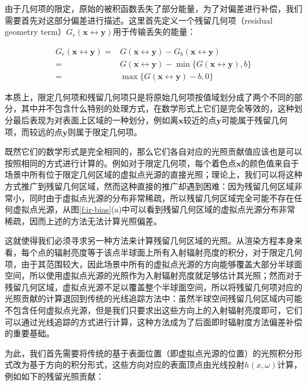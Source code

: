 由于几何项的限定，原始的被积函数丢失了部分能量，为了对偏差进行补偿，我们需要首先对这部分偏差进行描述。这里首先定义一个残留几何项（residual geometry term）$G_r(\mathbf{x}\leftrightarrow\mathbf{y})$用于传输丢失的能量：

\begin{equation}
\begin{aligned}
	G_r(\mathbf{x}\leftrightarrow\mathbf{y})=&G(\mathbf{x}\leftrightarrow\mathbf{y})-G_b(\mathbf{x}\leftrightarrow\mathbf{y})\\
	=&G(\mathbf{x}\leftrightarrow\mathbf{y})-\min\{G(\mathbf{x}\leftrightarrow\mathbf{y}),b\}\\
	=&\max\{G(\mathbf{x}\leftrightarrow\mathbf{y})-b,0\}
\end{aligned}
\end{equation}

本质上，限定几何项和残留几何项只是将原始几何项按值域划分成了两个不同的部分，其中并不包含什么特别的处理方式，在数学形式上它们是完全等效的，这种划分最后表现为对表面上区域的一种划分，例如离$\mathbf{x}$较近的点$\mathbf{y}$可能属于残留几何项，而较远的点$\mathbf{y}$则属于限定几何项。

既然它们的数学形式是完全相同的，那么它们各自对应的光照贡献值应该也是可以按照相同的方式进行计算的。例如对于限定几何项，每个着色点$\mathbf{x}$的颜色值来自于场景中所有位于限定几何区域的虚拟点光源的直接光照；理论上，我们可以将这种方式推广到残留几何区域，然而这种直接的推广却遇到困难：因为残留几何区域非常小，同时由于虚拟点光源的分布非常稀疏，所以残留几何区域完全可能不存在任何虚拟点光源，从图\ref{f:ir-bias}(a)中可以看到残留几何区域的虚拟点光源分布非常稀疏，因而上述的方法无法计算光照偏差。

这就使得我们必须寻求另一种方法来计算残留几何区域的光照。从渲染方程本身来看，每个点的辐射亮度等于该点半球面上所有入射辐射亮度的积分，对于限定几何项，由于其范围较大，因此场景中所有的虚拟点光源的方向能够覆盖大部分半球面空间，所以使用虚拟点光源的光照作为入射辐射亮度就足够估计其光照；然而对于残留几何区域，虚拟点光源不足以覆盖整个半球面空间，所以\cite{a:IlluminationinthePresenceofWeakSingularities}将残留几何项对应的光照贡献的计算退回到传统的光线追踪方法中：虽然半球空间残留几何区域内可能不包含任何虚拟点光源，但是我们只要求出这些方向上的入射辐射亮度即可，它们可以通过光线追踪的方式进行计算，这种方法成为了后面即时辐射度方法偏差补偿的重要基础。

为此，我们首先需要将传统的基于表面位置（即虚拟点光源的位置）的光照积分形式改为基于方向的积分形式，这些方向对应的表面顶点由光线投射$h(x,\omega)$计算，例如如下的残留光照贡献：

